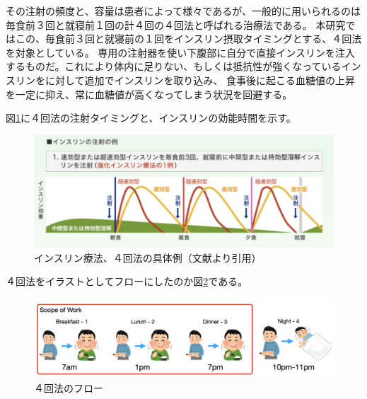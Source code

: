 その注射の頻度と、容量は患者によって様々であるが、一般的に用いられるのは毎食前３回と就寝前１回の計４回の４回法と呼ばれる治療法である。\cite{insulin_treatment_method}\cite{diabetes_treatment_type1}
本研究ではこの、毎食前３回と就寝前の１回をインスリン摂取タイミングとする、４回法を対象としている。
専用の注射器を使い下腹部に自分で直接インスリンを注入するものだ。これにより体内に足りない、もしくは抵抗性が強くなっているインスリンをに対して追加でインスリンを取り込み、
食事後に起こる血糖値の上昇を一定に抑え、常に血糖値が高くなってしまう状況を回避する。

\newpage

図\ref{fig:insulin_4times_method}に４回法の注射タイミングと、インスリンの効能時間を示す。

\begin{figure}[htbp]
  \caption{インスリン療法、４回法の具体例（文献\cite{insulin_4times_method}より引用）}
  \label{fig:insulin_4times_method}
  \begin{center}
    \includegraphics[bb=0 0 700 300,width=15cm]{assets/insulin_4times_method.png}
  \end{center}
\end{figure}

４回法をイラストとしてフローにしたのか図\ref{fig:insulin_4times_method_flow}である。

\begin{figure}[htbp]
  \caption{４回法のフロー}
  \label{fig:insulin_4times_method_flow}
  \begin{center}
    \includegraphics[bb=0 0 1000 300,width=15cm]{assets/insulin_4times_method_flow.png}
  \end{center}
\end{figure}

